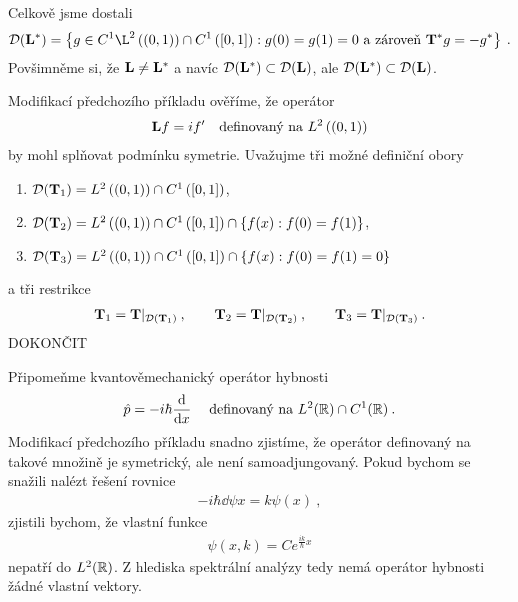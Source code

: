 \begin{example}
Celkově jsme dostali \begin{align*}
    \mathcal{D}(\map L^*) = \left \lbrace g \in C^1 \L^2\left( (0,1)\right) \cap C^1 \left(  [0,1] \right) :  g(0)=g(1)=0 \text{ a zároveň } \map T^* g=-g^* \right \rbrace \:.
\end{align*}
Povšimněme si, že $\mathbf{L} \neq \mathbf{L}^* $ a navíc $\mathcal{D}(\mathbf{L}^*) \subset \mathcal{D}(\mathbf{L})$, ale $\mathcal{D}(\mathbf{L}^*) \subset \mathcal{D}(\mathbf{L})$.
\end{example}

\begin{example}
Modifikací předchozího příkladu ověříme, že operátor \begin{align*}
    \mathbf{L} f = i f' \quad \text{definovaný na } L^2 \left( (0,1) \right)
\end{align*}
by mohl splňovat podmínku symetrie.
Uvažujme tři možné definiční obory \begin{enumerate}
    \item $\mathcal{D}(\mathbf{T}_1) = L^2 \left( (0,1) \right) \cap  C^1 \left( [0,1] \right)$,
    \item $\mathcal{D}(\mathbf{T}_2) = L^2 \left( (0,1) \right) \cap  C^1 \left( [0,1] \right) \cap \{ f(x): f(0)=f(1)\}$,
    \item $\mathcal{D}(\mathbf{T}_3) = L^2 \left( (0,1) \right) \cap  C^1 \left( [0,1] \right) \cap \{ f(x): f(0)=f(1)=0\}$
\end{enumerate}
a tři restrikce \begin{align*}
    \mathbf{T}_1 = \mathbf{T}\rvert_{\mathcal{D}(\mathbf{T}_1)} \:, \qquad \mathbf{T}_2 = \mathbf{T}\rvert_{\mathcal{D}(\mathbf{T}_2)} \:, \qquad \mathbf{T}_3 = \mathbf{T}\rvert_{\mathcal{D}(\mathbf{T}_3)} \:.
\end{align*}
DOKONČIT
\end{example}

\begin{remark}
Připomeňme kvantověmechanický operátor hybnosti \begin{align*}
    \hat p = -i \hbar \frac{\mathrm{d} }{\mathrm{d} x} \; \quad \text{definovaný na } L^2(\mathbb{R}) \cap C^1(\mathbb{R}) \:.
\end{align*}
Modifikací předchozího příkladu snadno zjistíme, že operátor definovaný na takové množině je symetrický, ale není samoadjungovaný. Pokud bychom se snažili nalézt řešení rovnice \begin{align*}
    -i \hbar \dd{\psi}{x} = k \psi(x) \:,
\end{align*}
zjistili bychom, že vlastní funkce \begin{align*}
    \psi(x, k) = C e^{\frac{ik}{\hbar} x}
\end{align*}
nepatří do $L^2(\mathbb{R})$. Z hlediska spektrální analýzy tedy nemá operátor hybnosti žádné vlastní vektory.
\end{remark}

